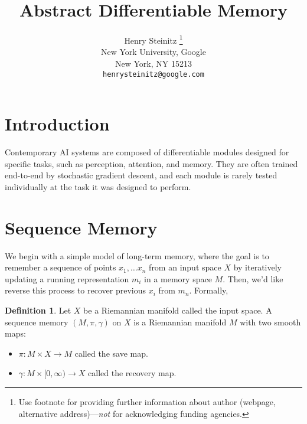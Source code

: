 \documentclass{article}
\title{Abstract Differentiable Memory}
\author{
  Henry Steinitz
  \thanks{Use footnote for providing further
    information about author (webpage, alternative
    address)---\emph{not} for acknowledging funding agencies.} \\
    New York University, Google\\
    New York, NY 15213 \\
  \texttt{henrysteinitz@google.com} \\
}
\theoremstyle{definition}
\newtheorem{definition}{Definition}[section]
\theoremstyle{theorem}
\begin{document}
\maketitle

\begin{abstract}

\end{abstract}

\section{Introduction}

Contemporary AI systems are composed of differentiable modules designed for specific tasks, such as perception, attention, and memory. They are often trained end-to-end by stochastic gradient descent, and each module is rarely tested individually at the task it was designed to perform.

\section{Sequence Memory}

We begin with a simple model of long-term memory, where the goal is to remember a sequence of points $x_1, \dots x_n$ from an input space $X$ by iteratively updating a running representation $m_i$ in a memory space $M$. Then, we'd like reverse this process to recover previous $x_i$ from $m_n$. Formally,

\begin{definition}
Let $X$ be a Riemannian manifold called the input space. A sequence memory $(M, \pi, \gamma)$ on $X$ is a Riemannian manifold $M$ with two smooth maps:
\begin{itemize}
    \item $\pi: M \times X \rightarrow M$ called the save map.
    \item $\gamma: M \times [0, \infty) \rightarrow X$ called the recovery map.
\end{itemize}
\end{definition} 
\end{document}
